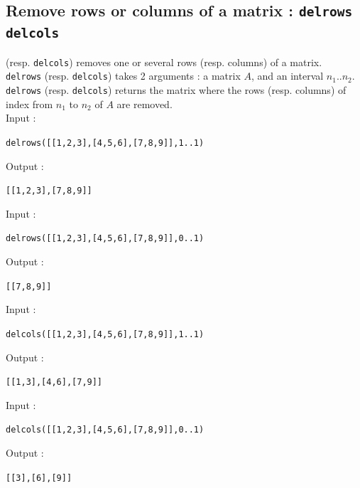 \documentclass[a4paper,11pt]{book}
\begin{document}
\subsection{Remove rows or columns of a matrix : {\tt delrows delcols}}
 (resp. {\tt delcols}) removes one or several rows (resp. 
columns) of a matrix.\\
{\tt delrows} (resp. {\tt delcols}) takes 2 arguments : a matrix $A$, and  
an interval $n_1..n_2$.\\
{\tt delrows} (resp. {\tt delcols}) returns the matrix where the rows 
(resp. columns) of index from $n_1$ to $n_2$ of $A$ are removed.\\
Input :
\begin{center}{\tt delrows([[1,2,3],[4,5,6],[7,8,9]],1..1)}\end{center}
Output :
\begin{center}{\tt [[1,2,3],[7,8,9]]}\end{center}
Input :
\begin{center}{\tt delrows([[1,2,3],[4,5,6],[7,8,9]],0..1)}\end{center}
Output :
\begin{center}{\tt [[7,8,9]]}\end{center}
Input :
\begin{center}{\tt delcols([[1,2,3],[4,5,6],[7,8,9]],1..1)}\end{center}
Output :
\begin{center}{\tt [[1,3],[4,6],[7,9]]}\end{center}
Input :
\begin{center}{\tt delcols([[1,2,3],[4,5,6],[7,8,9]],0..1)}\end{center}
Output :
\begin{center}{\tt [[3],[6],[9]]}\end{center}
\end{document}
